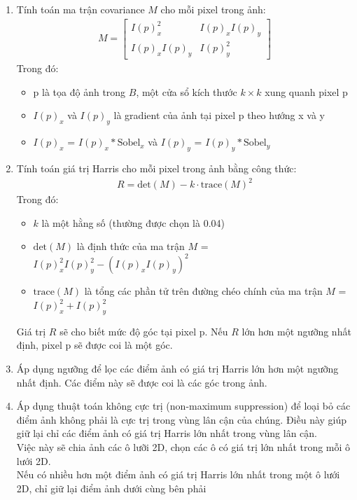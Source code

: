 \documentclass[12pt]{article}
\begin{document}
\begin{enumerate}
    \item Tính toán ma trận covariance $M$ cho mỗi pixel trong ảnh:
        \begin{align}
        M = \begin{bmatrix} I(p)_x^2 & I(p)_x I(p)_y \\ I(p)_x I(p)_y & I(p)_y^2 \end{bmatrix}
        \end{align}
        Trong đó:
        \begin{itemize}
            \item p là tọa độ ảnh trong $B$, một cửa sổ kích thước $k \times k$ xung quanh pixel p
            \item $I(p)_x$ và $I(p)_y$ là gradient của ảnh tại pixel p theo hướng x và y
            \item $I(p)_x$ = $I(p)_x * \text{Sobel}_x$ và $I(p)_y$ = $I(p)_y * \text{Sobel}_y$
        \end{itemize} 

    \item Tính toán giá trị Harris cho mỗi pixel trong ảnh bằng công thức:
        \begin{align}
        R = \text{det}(M) - k \cdot \text{trace}(M)^2
        \end{align}
        Trong đó:
        \begin{itemize}
            \item $k$ là một hằng số (thường được chọn là 0.04)
            \item $\text{det}(M)$ là định thức của ma trận $M$ = $I(p)_x^2 I(p)_y^2 - (I(p)_x I(p)_y)^2$
            \item $\text{trace}(M)$ là tổng các phần tử trên đường chéo chính của ma trận $M$ = $I(p)_x^2 + I(p)_y^2$
        \end{itemize}
        Giá trị $R$ sẽ cho biết mức độ góc tại pixel p. Nếu $R$ lớn hơn một ngưỡng nhất định, pixel p sẽ được coi là một góc.
    
    \item Áp dụng ngưỡng để lọc các điểm ảnh có giá trị Harris lớn hơn một ngưỡng nhất định. Các điểm này sẽ được coi là các góc trong ảnh.
    
    \item Áp dụng thuật toán không cực trị (non-maximum suppression) để loại bỏ các điểm ảnh không phải là cực trị trong vùng lân cận của chúng. Điều này giúp giữ lại chỉ các điểm ảnh có giá trị Harris lớn nhất trong vùng lân cận.\\
        Việc này sẽ chia ảnh các ô lưỡi 2D, chọn các ô có giá trị lớn nhất trong mỗi ô lưới 2D.\\
        Nếu có nhiều hơn một điểm ảnh có giá trị Harris lớn nhất trong một ô lưới 2D, chỉ giữ lại điểm ảnh dưới cùng bên phải\\
\end{enumerate}
\end{document}
